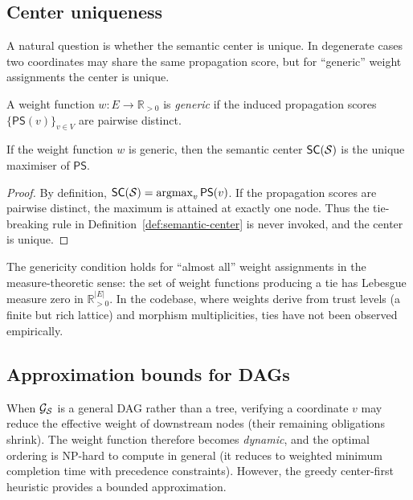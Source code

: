 \documentclass[11pt]{article}
\newcommand{\SC}{\mathsf{SC}}               %
\newcommand{\MG}{\mathcal{G}_{\Site}}       %
\newcommand{\PropScore}{\mathsf{PS}}        %
\newcommand{\wt}{w}                         %
\begin{document}
\subsection{Center uniqueness}\label{sec:uniqueness}

A natural question is whether the semantic center is unique.  In
degenerate cases two coordinates may share the same propagation score,
but for ``generic'' weight assignments the center is unique.

\begin{definition}\label{def:generic}
A weight function $\wt : E \to \mathbb{R}_{>0}$ is \emph{generic} if
the induced propagation scores $\{\PropScore(v)\}_{v \in V}$ are
pairwise distinct.
\end{definition}

\begin{theorem}\label{thm:uniqueness}
If the weight function $\wt$ is generic, then the semantic center
$\SC(\Site)$ is the unique maximiser of $\PropScore$.
\end{theorem}
\begin{proof}
By definition, $\SC(\Site) = \operatorname{argmax}_v \PropScore(v)$.
If the propagation scores are pairwise distinct, the maximum is attained
at exactly one node.  Thus the tie-breaking rule in
Definition~\ref{def:semantic-center} is never invoked, and the center
is unique.
\end{proof}

\begin{remark}
The genericity condition holds for ``almost all'' weight assignments in
the measure-theoretic sense: the set of weight functions producing a
tie has Lebesgue measure zero in $\mathbb{R}_{>0}^{|E|}$.  In the
\JuGeo{} codebase, where weights derive from trust levels (a finite
but rich lattice) and morphism multiplicities, ties have not been
observed empirically.
\end{remark}

\subsection{Approximation bounds for DAGs}\label{sec:approx-dag}

When $\MG$ is a general DAG rather than a tree, verifying a coordinate
$v$ may reduce the effective weight of downstream nodes (their
remaining obligations shrink).  The weight function therefore becomes
\emph{dynamic}, and the optimal ordering is NP-hard to compute in
general (it reduces to weighted minimum completion time with
precedence constraints).  However, the greedy center-first heuristic
provides a bounded approximation.
\end{document}
